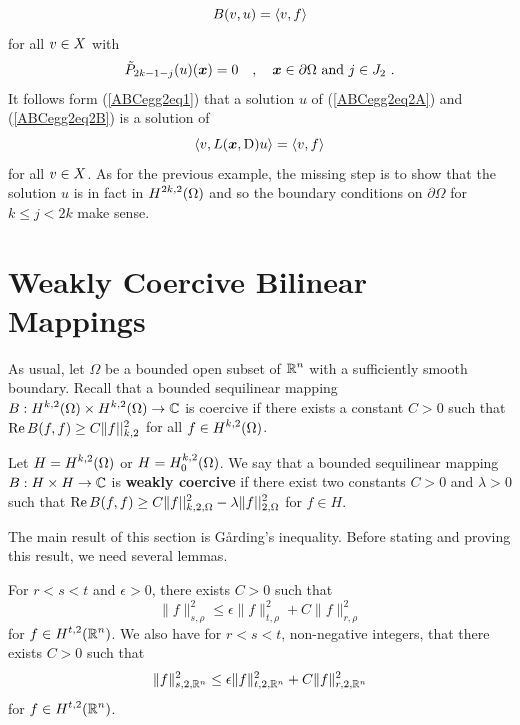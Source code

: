 \begin{egg}
\begin{equation} \label{ABCegg2eq2A}
  B(v,u) = \left\langle{v} , {f}\right\rangle
\end{equation}
for all $\displaystyle v\in X$ with
\begin{equation} \label{ABCegg2eq2B}
\tilde{P}_{2k-1-j}(u)({\bm{x}}) = 0  \quad , \quad {\bm{x}} \in \partial \Omega
\ \text{and} \ j \in J_2 \ .
\end{equation}
It follows form (\ref{ABCegg2eq1}) that a solution $u$ of
(\ref{ABCegg2eq2A}) and (\ref{ABCegg2eq2B}) is a solution of
\[
\left\langle{v} , {L({\bm{x}},\operatorname{D})u}\right\rangle = \left\langle{v} , {f}\right\rangle
\]
for all $\displaystyle v\in X$.
As for the previous example, the missing step is to show that the
solution $u$ is in fact in $\displaystyle H^{2k,2}(\Omega)$ and so the
boundary conditions on $\partial \Omega$ for $k \leq j < 2k$ make sense.
\end{egg}

\section{Weakly Coercive Bilinear Mappings}

As usual, let $\Omega$ be a bounded open subset of $\displaystyle \mathbb{R}^n$ with a
sufficiently smooth boundary.  Recall that a bounded sequilinear mapping
$\displaystyle B:H^{k,2}(\Omega)\times H^{k,2}(\Omega) \rightarrow \mathbb{C}$
is coercive if there exists a constant $C>0$ such that 
$\displaystyle \operatorname{Re} B(f,f) \geq C \|f||_{k,2}^2$ for all
$\displaystyle f \in H^{k,2}(\Omega)$.

\begin{defn} \label{ell_weakcoerc}
Let $\displaystyle H = H^{k,2}(\Omega)$ or $\displaystyle H = H^{k,2}_0(\Omega)$.
We say that a bounded sequilinear mapping
$B:H \times H \rightarrow \mathbb{C}$ is {\bfseries weakly coercive}
 if 
there exist two constants $C>0$ and $\lambda >0$ such that 
$\displaystyle \operatorname{Re} B(f,f) \geq C \|f||_{k,2,\Omega}^2 - \lambda
\|f||_{2,\Omega}^2$ for $f \in H$.
\end{defn}

The main result of this section is G\r{a}rding's inequality.  Before
stating and proving this result, we need several lemmas.

\begin{lemma} \label{ell_garding4}
For $r<s<t$ and $\epsilon>0$, there exists $C>0$ such that
\[
\|f\|_{s,\rho}^2 \leq \epsilon \| f\|_{t,\rho}^2 + C \| f \|_{r,\rho}^2
\]
for $\displaystyle f \in H^{t,2}(\mathbb{R}^n)$.
We also have for $r<s<t$, non-negative integers, that there exists
$C>0$ such that
\[
\|f\|_{s,2,\mathbb{R}^n}^2 \leq \epsilon \| f\|_{t,2,\mathbb{R}^n}^2 + C \| f \|_{r,2,\mathbb{R}^n}^2
\]
for $\displaystyle f \in H^{t,2}(\mathbb{R}^n)$.
\end{lemma}

